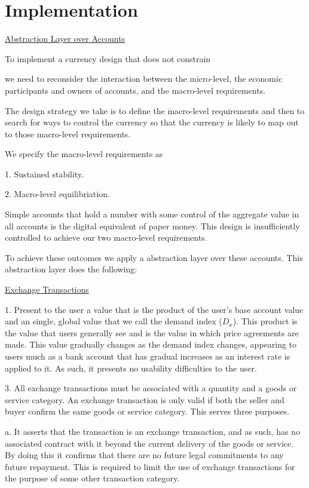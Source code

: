 \section{Implementation}
\label{section:implementation}

\underline{Abstraction Layer over Accounts}

To implement a currency design that does not constrain 


we need to reconsider the interaction between the micro-level, the economic participants and owners
of accounts, and the macro-level requirements.

The design strategy we take is to define the macro-level requirements and then to search for ways to
control the currency so that the currency is likely to map out to those macro-level requirements.   

We specify the macro-level requirements as

1. Sustained stability.

2. Macro-level equilibriation.

Simple accounts that hold a number with some control of the aggregate value in all accounts is the
digital equivalent of paper money. This design is insufficiently controlled to achieve our two
macro-level requirements.   

To achieve these outcomes we apply a abstraction layer over these accounts. This abstraction layer
does the following:

\underline{Exchange Transactions}

1. Present to the user a value that is the product of the user's base account value and an single,
global value that we call the demand index ($D_x$). This product is the value that users generally
see and is the value in which price agreements are made. This value gradually changes as the demand
index changes, appearing to users much as a bank account that has gradual increases as an interest
rate is applied to it. As such, it presents no usability difficulties to the user.

3. All exchange transactions must be associated with a quantity and a goods or service category. An
exchange transaction is only valid if both the seller and buyer confirm the same goods or service
category. This serves three purposes.

a. It asserts that the transaction is an exchange transaction, and as such, has no associated
contract with it beyond the current delivery of the goods or service. By doing this it confirms that
there are no future legal commitments to any future repayment. This is required to limit the use of
exchange transactions for the purpose of some other transaction category.

